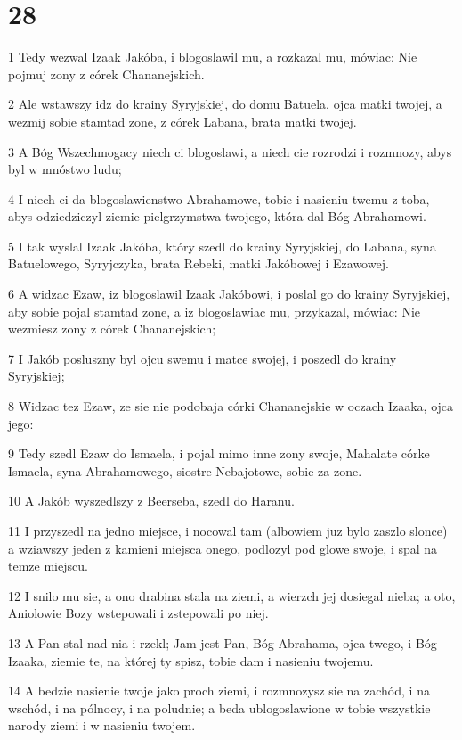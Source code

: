 \chapter{28}

\par 1 Tedy wezwal Izaak Jakóba, i blogoslawil mu, a rozkazal mu, mówiac: Nie pojmuj zony z córek Chananejskich.
\par 2 Ale wstawszy idz do krainy Syryjskiej, do domu Batuela, ojca matki twojej, a wezmij sobie stamtad zone, z córek Labana, brata matki twojej.
\par 3 A Bóg Wszechmogacy niech ci blogoslawi, a niech cie rozrodzi i rozmnozy, abys byl w mnóstwo ludu;
\par 4 I niech ci da blogoslawienstwo Abrahamowe, tobie i nasieniu twemu z toba, abys odziedziczyl ziemie pielgrzymstwa twojego, która dal Bóg Abrahamowi.
\par 5 I tak wyslal Izaak Jakóba, który szedl do krainy Syryjskiej, do Labana, syna Batuelowego, Syryjczyka, brata Rebeki, matki Jakóbowej i Ezawowej.
\par 6 A widzac Ezaw, iz blogoslawil Izaak Jakóbowi, i poslal go do krainy Syryjskiej, aby sobie pojal stamtad zone, a iz blogoslawiac mu, przykazal, mówiac: Nie wezmiesz zony z córek Chananejskich;
\par 7 I Jakób posluszny byl ojcu swemu i matce swojej, i poszedl do krainy Syryjskiej;
\par 8 Widzac tez Ezaw, ze sie nie podobaja córki Chananejskie w oczach Izaaka, ojca jego:
\par 9 Tedy szedl Ezaw do Ismaela, i pojal mimo inne zony swoje, Mahalate córke Ismaela, syna Abrahamowego, siostre Nebajotowe, sobie za zone.
\par 10 A Jakób wyszedlszy z Beerseba, szedl do Haranu.
\par 11 I przyszedl na jedno miejsce, i nocowal tam (albowiem juz bylo zaszlo slonce) a wziawszy jeden z kamieni miejsca onego, podlozyl pod glowe swoje, i spal na temze miejscu.
\par 12 I snilo mu sie, a ono drabina stala na ziemi, a wierzch jej dosiegal nieba; a oto, Aniolowie Bozy wstepowali i zstepowali po niej.
\par 13 A Pan stal nad nia i rzekl; Jam jest Pan, Bóg Abrahama, ojca twego, i Bóg Izaaka, ziemie te, na której ty spisz, tobie dam i nasieniu twojemu.
\par 14 A bedzie nasienie twoje jako proch ziemi, i rozmnozysz sie na zachód, i na wschód, i na pólnocy, i na poludnie; a beda ublogoslawione w tobie wszystkie narody ziemi i w nasieniu twojem.
